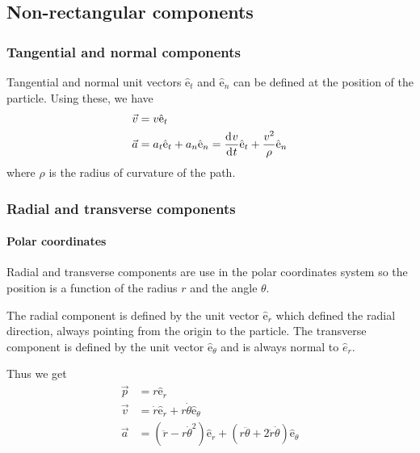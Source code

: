 \documentclass[10pt, twocolumn]{article}
\begin{document}
\subsection{Non-rectangular components}
\subsubsection{Tangential and normal components}
Tangential and normal unit vectors \(\hat{\mathrm{e}}_t\) and \(\hat{\mathrm{e}}_n\) can be defined at the position of the particle.
Using these, we have
\begin{align*}
  \vec{v} & = v\hat{\mathrm{e}}_t                                                                                                      \\
  \vec{a} & = a_t\hat{\mathrm{e}}_t + a_n\hat{\mathrm{e}}_n = \frac{\mathrm{d}^{} v}{\mathrm{d}^{} t}\hat{\mathrm{e}}_t + \frac{v^2}{\rho}\hat{\mathrm{e}}_n
\end{align*}
where \(\rho\) is the radius of curvature of the path.


\subsubsection{Radial and transverse components}
\paragraph{Polar coordinates}
Radial and transverse components are use in the polar coordinates system so the position is a function of the radius \(r\) and the angle \(\theta\).

The radial component is defined by the unit vector \(\hat{\mathrm{e}}_r\) which defined the radial direction, always pointing from the origin to the particle.
The transverse component is defined by the unit vector \(\hat{\mathrm{e}}_\theta\) and is always normal to \(\hat{e}_r\).

Thus we get
\begin{align*}
  \vec{p} & = r\hat{\mathrm{e}}_r                                                                                                                       \\
  \vec{v} & = \dot{r}\hat{\mathrm{e}}_r + r\dot{\theta}\hat{\mathrm{e}}_\theta                                                                          \\
  \vec{a} & = \left( \ddot{r} - r\dot{\theta}^2 \right)\hat{\mathrm{e}}_r + \left( r\ddot{\theta} + 2\dot{r}\dot{\theta} \right)\hat{\mathrm{e}}_\theta
\end{align*}
\end{document}
